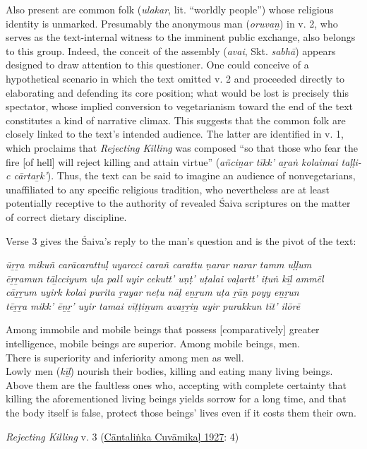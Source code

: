 Also present are common folk (\emph{ulakar}, lit. “worldly people”) whose religious identity is unmarked. Presumably the anonymous man (\emph{oruvaṉ}) in v. 2, who serves as the text-internal witness to the imminent public exchange, also belongs to this group. Indeed, the conceit of the assembly (\emph{avai}, Skt. \emph{sabhā}) appears designed to draw attention to this questioner. One could conceive of a hypothetical scenario in which the text omitted v. 2 and proceeded directly to elaborating and defending its core position; what would be lost is precisely this spectator, whose implied conversion to vegetarianism toward the end of the text constitutes a kind of narrative climax. This suggests that the common folk are closely linked to the text’s intended audience. The latter are identified in v. 1, which proclaims that \emph{Rejecting Killing} was composed “so that those who fear the fire [of hell] will reject killing and attain virtue” (\emph{añciṉar tīkk’ aṟaṅ kolaimai taḷḷi-c cārtaṟk’}). Thus, the text can be said to imagine an audience of nonvegetarians, unaffiliated to any specific religious tradition, who nevertheless are at least potentially receptive to the authority of revealed Śaiva scriptures on the matter of correct dietary discipline. 


Verse 3 gives the Śaiva’s reply to the man’s question and is the pivot of the text:

\begin{pullquote}\raggedright
      \emph{ūṟṟa mikuñ carācarattuḷ uyarcci carañ carattu ṇarar narar tamm uḷḷum}\\
\emph{ēṟṟamun tāḻcciyum uḷa pall uyir cekutt’ uṇṭ’ uṭalai vaḷartt’ iṭuṅ kīḻ ammēl}\\
\emph{cāṟṟum uyirk kolai purita ṟuyar neṭu nāḷ eṉṟum uṭa ṟāṉ poyy eṉṟun}\\
\emph{tēṟṟa mikk’ ēṉṟ’ uyir tamai vīṭṭiṉum avaṟṟiṉ uyir purakkun tīt’ ilōrē}
\end{pullquote}
      
\begin{pullquote}


	
	    Among immobile and mobile beings that possess [comparatively] greater intelligence, mobile beings are superior. Among mobile beings, men.\\ There is superiority and inferiority among men as well.\\
	    Lowly men (\emph{kīḻ}) nourish their bodies, killing and eating many living beings.\\
	    Above them are the faultless ones who, accepting with complete certainty that killing the aforementioned living beings yields sorrow for a long time, and that the body itself is false, protect those beings’ lives even if it costs them their own.
	  \\


\medskip\hfill\begin{minipage}{0.9\textwidth}\small\hfill
\emph{Rejecting Killing} v. 3  (\hyperref[CantalinkaCuvamikal1927]{Cāntaliṅka Cuvāmikaḷ 1927}: 4)\end{minipage}\hspace{2em}
\end{pullquote}

